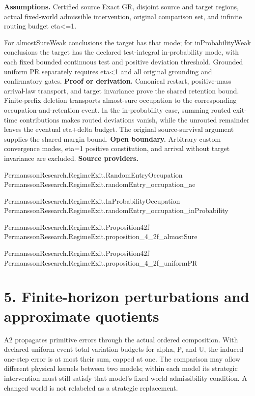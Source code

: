 \documentclass[11pt,a4paper]{article}
\begin{document}
\textbf{Assumptions.} Certified source Exact GR, disjoint source and target regions, actual fixed-world admissible intervention, original comparison set, and infinite routing budget eta<=1.

For almostSureWeak conclusions the target has that mode; for inProbabilityWeak conclusions the target has the declared test-integral in-probability mode, with each fixed bounded continuous test and positive deviation threshold. Grounded uniform PR separately requires eta<1 and all original grounding and confirmatory gates.
\textbf{Proof or derivation.} Canonical restart, positive-mass arrival-law transport, and target invariance prove the shared retention bound. Finite-prefix deletion transports almost-sure occupation to the corresponding occupation-and-retention event. In the in-probability case, summing routed exit-time contributions makes routed deviations vanish, while the unrouted remainder leaves the eventual eta+delta budget. The original source-survival argument supplies the shared margin bound.
\textbf{Open boundary.} Arbitrary custom convergence modes, eta=1 positive constitution, and arrival without target invariance are excluded.
\textbf{Source providers.}
{\footnotesize\raggedright PermanssonRe\allowbreak{}search.Regim\allowbreak{}eExit.Random\allowbreak{}EntryOccupat\allowbreak{}ion\\ PermanssonRe\allowbreak{}search.Regim\allowbreak{}eExit.random\allowbreak{}Entry\_occupa\allowbreak{}tion\_ae\par}
{\footnotesize\raggedright PermanssonRe\allowbreak{}search.Regim\allowbreak{}eExit.InProb\allowbreak{}abilityOccup\allowbreak{}ation\\ PermanssonRe\allowbreak{}search.Regim\allowbreak{}eExit.random\allowbreak{}Entry\_occupa\allowbreak{}tion\_inProba\allowbreak{}bility\par}
{\footnotesize\raggedright PermanssonRe\allowbreak{}search.Regim\allowbreak{}eExit.Propos\allowbreak{}ition42f\\ PermanssonRe\allowbreak{}search.Regim\allowbreak{}eExit.propos\allowbreak{}ition\_4\_2f\_a\allowbreak{}lmostSure\par}
{\footnotesize\raggedright PermanssonRe\allowbreak{}search.Regim\allowbreak{}eExit.Propos\allowbreak{}ition42f\\ PermanssonRe\allowbreak{}search.Regim\allowbreak{}eExit.propos\allowbreak{}ition\_4\_2f\_u\allowbreak{}niformPR\par}
\section{5. Finite-horizon perturbations and approximate quotients}
A2 propagates primitive errors through the actual ordered composition. With declared uniform event-total-variation budgets for alpha, P, and U, the induced one-step error is at most their sum, capped at one. The comparison may allow different physical kernels between two models; within each model its strategic intervention must still satisfy that model's fixed-world admissibility condition. A changed world is not relabeled as a strategic replacement.
\end{document}
